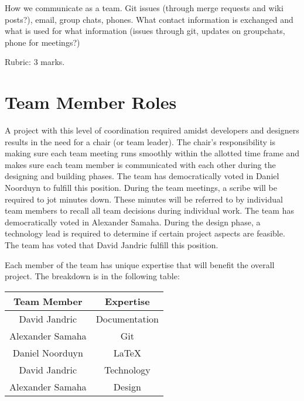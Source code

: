 \documentclass{article}
\begin{document}
How we communicate as a team.  Git issues (through merge requests and wiki
posts?), email, group chats, phones.  What contact information is exchanged and
what is used for what information (issues through git,  updates on groupchats,
phone for meetings?)

Rubric:  3 marks.

\section{Team Member Roles}
%


A project with this level of coordination required amidst developers and
designers results in the need for a chair (or team leader). The chair's
responsibility is making sure each team meeting runs smoothly within the
allotted time frame and makes sure each team member is communicated with each
other during the designing and building phases. The team has democratically
voted in Daniel Noorduyn to fulfill this position.  During the team meetings, a
scribe will be required to jot minutes down. These minutes will be referred to
by individual team members to recall all team decisions during individual work.
The team has democratically voted in Alexander Samaha. During the design phase,
a technology lead is required to determine if certain project aspects are
feasible. The team has voted that David Jandric fulfill this position.

Each member of the team has unique expertise that will benefit the overall
project. The breakdown is in the following table:

\begin{center}
  \begin{tabular}{ |c|c| }
    \hline
    Team Member & Expertise\\
    \hline
     David Jandric & Documentation\\
     Alexander Samaha & Git\\
     Daniel Noorduyn & LaTeX\\
     David Jandric & Technology\\
     Alexander Samaha & Design\\
    \hline
  \end{tabular}
\end{center}
\end{document}
